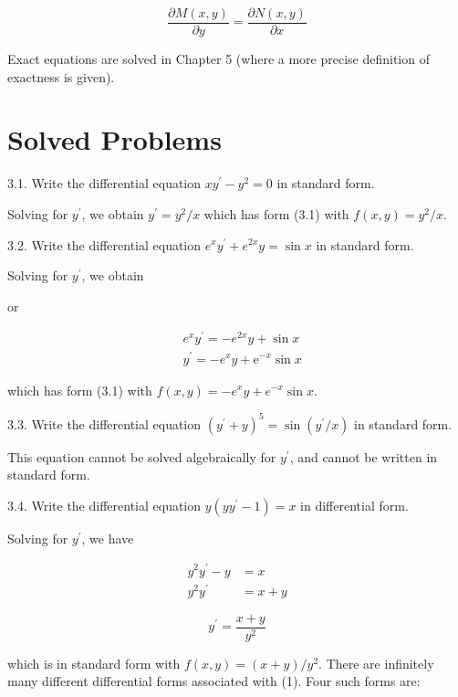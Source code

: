 \documentclass[10pt]{article}
\begin{document}
\begin{equation*}
\frac{\partial M(x, y)}{\partial y}=\frac{\partial N(x, y)}{\partial x} \tag{3.6}
\end{equation*}


Exact equations are solved in Chapter 5 (where a more precise definition of exactness is given).

\section*{Solved Problems}
3.1. Write the differential equation $x y^{\prime}-y^{2}=0$ in standard form.

Solving for $y^{\prime}$, we obtain $y^{\prime}=y^{2} / x$ which has form (3.1) with $f(x, y)=y^{2} / x$.

3.2. Write the differential equation $e^{x} y^{\prime}+e^{2 x} y=\sin x$ in standard form.

Solving for $y^{\prime}$, we obtain

or

$$
\begin{aligned}
& e^{x} y^{\prime}=-e^{2 x} y+\sin x \\
& y^{\prime}=-e^{x} y+\mathrm{e}^{-x} \sin x
\end{aligned}
$$

which has form (3.1) with $f(x, y)=-e^{x} y+e^{-x} \sin x$.

3.3. Write the differential equation $\left(y^{\prime}+y\right)^{5}=\sin \left(y^{\prime} / x\right)$ in standard form.

This equation cannot be solved algebraically for $y^{\prime}$, and cannot be written in standard form.

3.4. Write the differential equation $y\left(y y^{\prime}-1\right)=x$ in differential form.

Solving for $y^{\prime}$, we have

$$
\begin{aligned}
y^{2} y^{\prime}-y & =x \\
y^{2} y^{\prime} & =x+y
\end{aligned}
$$


\begin{equation*}
y^{\prime}=\frac{x+y}{y^{2}} \tag{1}
\end{equation*}


which is in standard form with $f(x, y)=(x+y) / y^{2}$. There are infinitely many different differential forms associated with (1). Four such forms are:
\end{document}
